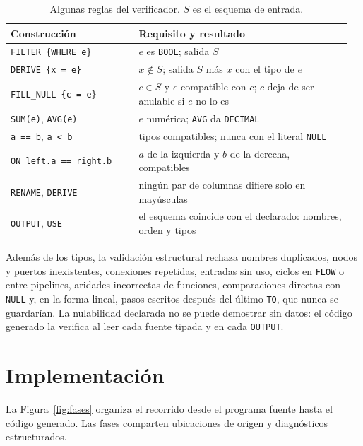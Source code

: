 \documentclass[sigplan,screen,nonacm]{acmart}
\begin{document}
\begin{table}[tbp]
\caption{Algunas reglas del verificador. $S$ es el esquema de entrada.}
\label{tab:reglas}
\footnotesize
\begin{tabular}{@{}p{0.36\linewidth}p{0.60\linewidth}@{}}
\toprule
Construcción & Requisito y resultado \\
\midrule
\texttt{FILTER \{WHERE e\}} & $e$ es \texttt{BOOL}; salida $S$ \\
\texttt{DERIVE \{x = e\}} & $x\notin S$; salida $S$ más $x$ con el tipo de $e$ \\
\texttt{FILL\_NULL \{c = e\}} & $c\in S$ y $e$ compatible con $c$; $c$ deja de ser
  anulable si $e$ no lo es \\
\texttt{SUM(e)}, \texttt{AVG(e)} & $e$ numérica; \texttt{AVG} da \texttt{DECIMAL} \\
\texttt{a == b}, \texttt{a < b} & tipos compatibles; nunca con el literal \texttt{NULL} \\
\texttt{ON left.a == right.b} & $a$ de la izquierda y $b$ de la derecha, compatibles \\
\texttt{RENAME}, \texttt{DERIVE} & ningún par de columnas difiere solo en mayúsculas \\
\texttt{OUTPUT}, \texttt{USE} & el esquema coincide con el declarado: nombres, orden y tipos \\
\bottomrule
\end{tabular}
\end{table}

Además de los tipos, la validación estructural rechaza nombres duplicados, nodos y puertos
inexistentes, conexiones repetidas, entradas sin uso, ciclos en \texttt{FLOW} o entre
pipelines, aridades incorrectas de funciones, comparaciones directas con \texttt{NULL} y,
en la forma lineal, pasos escritos después del último \texttt{TO}, que nunca se guardarían.
La nulabilidad declarada no se puede demostrar sin datos: el código generado la verifica al
leer cada fuente tipada y en cada \texttt{OUTPUT}.

\section{Implementación}
\label{sec:impl}

La Figura~\ref{fig:fases} organiza el recorrido desde el programa fuente hasta el código
generado. Las fases comparten ubicaciones de origen y diagnósticos estructurados.
\end{document}
